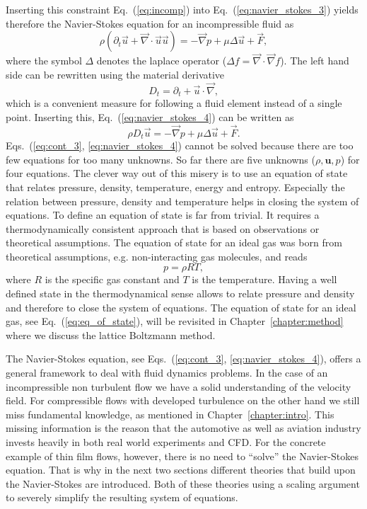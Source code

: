 Inserting this constraint Eq.~(\ref{eq:incomp}) into Eq.~(\ref{eq:navier_stokes_3}) yields therefore the Navier-Stokes equation for an incompressible fluid as
\begin{equation}\label{eq:navier_stokes_4}
    \rho(\partial_t\vec{u} + \vec{\nabla}\cdot\vec{u}\vec{u}) = - \vec{\nabla} p + \mu\Delta\vec{u} + \vec{F},
\end{equation}
where the symbol $\Delta$ denotes the laplace operator ($\Delta f = \vec{\nabla}\cdot\vec{\nabla} f$).
The left hand side can be rewritten using the material derivative
\begin{equation}\label{eq:mat_dev}
    D_t = \partial_t + \vec{u}\cdot\vec{\nabla}, 
\end{equation}
which is a convenient measure for following a fluid element instead of a single point.
Inserting this, Eq.~(\ref{eq:navier_stokes_4}) can be written as
\begin{equation}\label{eq:navier_stokes_fin}
    \rho D_t \vec{u} =  - \vec{\nabla} p + \mu\Delta\vec{u} + \vec{F}.
\end{equation}
Eqs.~(\ref{eq:cont_3}, \ref{eq:navier_stokes_4}) cannot be solved because there are too few equations for too many unknowns.
So far there are five unknowns ($\rho, \mathbf{u}, p$) for four equations.
The clever way out of this misery is to use an equation of state that relates pressure, density, temperature, energy and entropy.
Especially the relation between pressure, density and temperature helps in closing the system of equations.
To define an equation of state is far from trivial.
It requires a thermodynamically consistent approach that is based on observations or theoretical assumptions.
The equation of state for an ideal gas was born from theoretical assumptions, e.g. non-interacting gas molecules, and reads~\cite{schwablStatisticalMechanics2006}
\begin{equation}\label{eq:eq_of_state}
    p = \rho R T,
\end{equation}
where $R$ is the specific gas constant and $T$ is the temperature.
Having a well defined state in the thermodynamical sense allows to relate pressure and density and therefore to close the system of equations.
The equation of state for an ideal gas, see Eq.~(\ref{eq:eq_of_state}), will be revisited in Chapter~\ref{chapter:method} where we discuss the lattice Boltzmann method.

The Navier-Stokes equation, see Eqs.~(\ref{eq:cont_3}, \ref{eq:navier_stokes_4}), offers a general framework to deal with fluid dynamics problems.
In the case of an incompressible non turbulent flow we have a solid understanding of the velocity field.
For compressible flows with developed turbulence on the other hand we still miss fundamental knowledge, as mentioned in Chapter~\ref{chapter:intro}.
This missing information is the reason that the automotive as well as aviation industry invests heavily in both real world experiments and CFD. 
For the concrete example of thin film flows, however, there is no need to ``solve'' the Navier-Stokes equation.
That is why in the next two sections different theories that build upon the Navier-Stokes are introduced.
Both of these theories using a scaling argument to severely simplify the resulting system of equations.


